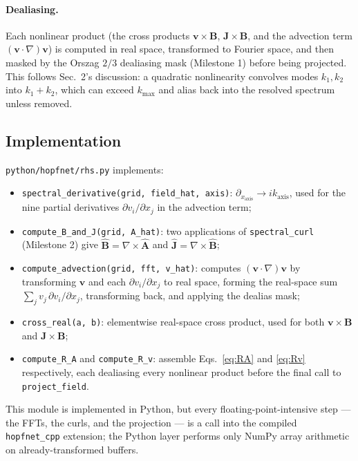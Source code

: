 \documentclass[11pt, a4paper]{article}
\newcommand{\curl}{\nabla \times}
\begin{document}
\paragraph{Dealiasing.} Each nonlinear product (the cross products
$\mathbf{v}\times\mathbf{B}$, $\mathbf{J}\times\mathbf{B}$, and the
advection term $(\mathbf{v}\cdot\nabla)\mathbf{v}$) is computed in real
space, transformed to Fourier space, and then masked by the Orszag $2/3$
dealiasing mask (Milestone 1) before being projected. This follows
Sec.~2's discussion: a quadratic nonlinearity convolves modes $k_1, k_2$
into $k_1+k_2$, which can exceed $k_{\max}$ and alias back into the
resolved spectrum unless removed.

\subsection{Implementation}

\texttt{python/hopfnet/rhs.py} implements:
\begin{itemize}
    \item \texttt{spectral\_derivative(grid, field\_hat, axis)}:
    $\partial_{x_{\mathrm{axis}}} \to i k_{\mathrm{axis}}$, used for the
    nine partial derivatives $\partial v_i/\partial x_j$ in the advection
    term;
    \item \texttt{compute\_B\_and\_J(grid, A\_hat)}: two applications of
    \texttt{spectral\_curl} (Milestone 2) give
    $\hat{\mathbf{B}}=\curl\hat{\mathbf{A}}$ and
    $\hat{\mathbf{J}}=\curl\hat{\mathbf{B}}$;
    \item \texttt{compute\_advection(grid, fft, v\_hat)}: computes
    $(\mathbf{v}\cdot\nabla)\mathbf{v}$ by transforming $\mathbf{v}$ and
    each $\partial v_i/\partial x_j$ to real space, forming the
    real-space sum $\sum_j v_j\,\partial v_i/\partial x_j$, transforming
    back, and applying the dealias mask;
    \item \texttt{cross\_real(a, b)}: elementwise real-space cross
    product, used for both $\mathbf{v}\times\mathbf{B}$ and
    $\mathbf{J}\times\mathbf{B}$;
    \item \texttt{compute\_R\_A} and \texttt{compute\_R\_v}: assemble
    Eqs.~\eqref{eq:RA} and \eqref{eq:Rv} respectively, each dealiasing
    every nonlinear product before the final call to
    \texttt{project\_field}.
\end{itemize}

This module is implemented in Python, but every floating-point-intensive
step --- the FFTs, the curls, and the projection --- is a call into the
compiled \texttt{hopfnet\_cpp} extension; the Python layer performs only
NumPy array arithmetic on already-transformed buffers.
\end{document}
